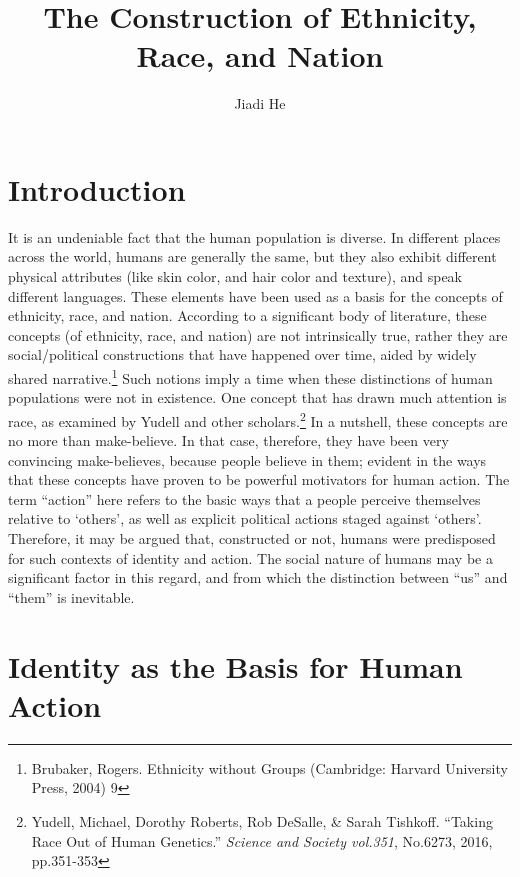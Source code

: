 \documentclass[11pt]{article}
\title{The Construction of Ethnicity, Race, and Nation}
\author{Jiadi He}
\begin{document}
\maketitle
\keywordsline

\section{Introduction}

It is an undeniable fact that the human population is diverse. In different places across the world, humans are generally the same, but they also exhibit different physical attributes (like skin color, and hair color and texture), and speak different languages. These elements have been used as a basis for the concepts of ethnicity, race, and nation. According to a significant body of literature, these concepts (of ethnicity, race, and nation) are not intrinsically true, rather they are social/political constructions that have happened over time, aided by widely shared narrative.\footnote{Brubaker, Rogers. Ethnicity without Groups (Cambridge: Harvard University Press, 2004) 9} Such notions imply a time when these distinctions of human populations were not in existence. One concept that has drawn much attention is race, as examined by Yudell and other scholars.\footnote{Yudell, Michael, Dorothy Roberts, Rob DeSalle, \& Sarah Tishkoff. “Taking Race Out of Human Genetics.” \textit{Science and Society vol.351}, No.6273, 2016, pp.351-353} In a nutshell, these concepts are no more than make-believe. In that case, therefore, they have been very convincing make-believes, because people believe in them; evident in the ways that these concepts have proven to be powerful motivators for human action. The term “action” here refers to the basic ways that a people perceive themselves relative to ‘others’, as well as explicit political actions staged against ‘others’. Therefore, it may be argued that, constructed or not, humans were predisposed for such contexts of identity and action. The social nature of humans may be a significant factor in this regard, and from which the distinction between “us” and “them” is inevitable.

\section{Identity as the Basis for Human Action}
\end{document}

